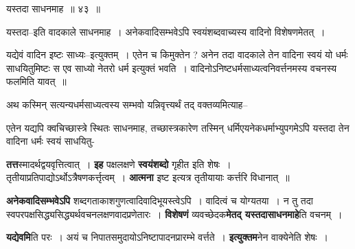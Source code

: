 \documentclass[article,12pt,a4paper]{memoir}
\begin{document}
	  \bigskip
	  \begingroup
	

	  \pstart यस्तदा साधनमाह ॥ ४३ ॥
	\pend
      
	  \endgroup
	 

	  \pstart यस्तदा--इति वादकाले साधनमाह । अनेकवादिसम्भवेऽपि स्वयंशब्दवाच्यस्य वादिनो विशेषणमेतत् ।
	\pend
        

	  \pstart यद्येवं वादिन इष्टः साध्यः--इत्युक्तम् । एतेन च किमुक्तेन ? अनेन तदा वादकाले तेन वादिना स्वयं यो धर्मः साधयितुमिष्टः स एव साध्यो नेतरो धर्म इत्युक्तं भवति । वादिनोऽनिष्टधर्मसाध्यत्वनिवर्त्तनमस्य वचनस्य फलमिति यावत् ॥
	\pend
        

	  \pstart अथ कस्मिन् सत्यन्यधर्मसाध्यत्वस्य सम्भवो यन्निवृत्त्यर्थं तद् वक्तव्यमित्याह--
	\pend
        
	  \bigskip
	  \begingroup
	

	  \pstart एतेन यद्यपि क्वचिच्छास्त्रे स्थितः साधनमाह, तच्छास्त्रकारेण तस्मिन् धर्मिएयनेकधर्माभ्युपगमेऽपि यस्तदा तेन वादिना धर्मः स्वयं साधयितु-
	\pend
      
	  \endgroup
	
	  \endgroup
	

	  \pstart \textbf{तत्त}स्मादर्थद्वयवृत्तित्वात् । \textbf{इह} पक्षलक्षणे \textbf{स्वयंशब्दो} गृहीत इति शेषः । तृतीयाप्रतिपाद्योऽर्थोऽत्रैषणकर्त्तृत्वम् । \textbf{आत्मना} इष्ट इत्यत्र तृतीयायाः कर्त्तरि विधानात् ॥
	\pend
      

	  \pstart \textbf{अनेकवादिसम्भवेऽपि} शब्दगताकाशगुणत्वादिवादिभूयस्त्वेऽपि । वादित्वं च योग्यतया । न तु तदा स्वपरपक्षसिद्ध्यसिद्ध्यर्थवचनलक्षणवादप्रणेतारः । \textbf{विशेषणं} व्यवच्छेदक\textbf{मेतद् यस्तदासाधनमाहे}ति वचनम् ।
	\pend
      

	  \pstart \textbf{यद्येवमि}ति परः । अयं च निपातसमुदायोऽनिष्टापादनप्रारम्भे वर्त्तते । \textbf{इत्युक्तम}नेन वाक्येनेति शेषः ।
	\pend
      
\end{document}
